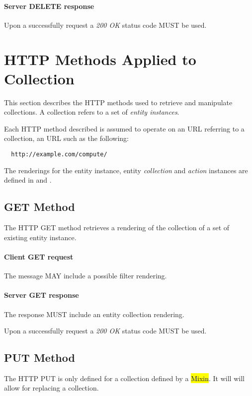 \documentclass[10pt,a4paper]{article}
\begin{document}
\paragraph{Server DELETE response}
Upon a successfully request a \emph{200 OK} status code MUST be used.

\section{HTTP Methods Applied to Collection}




This section describes the HTTP methods used to retrieve and manipulate
collections. A collection refers to a set of {\em entity instances}.

Each HTTP method described is assumed to operate
on an URL referring to a collection, an URL such as the following:
\begin{verbatim}
  http://example.com/compute/
\end{verbatim}

The renderings for the entity instance, entity {\em collection} and {\em action} instances are defined in \cite{occi:text} and \cite{occi:json}.

\subsection{GET Method}
The HTTP GET method retrieves a rendering of the collection of a set of existing entity instance.

\paragraph{Client GET request}
The message MAY include a possible filter rendering.

\paragraph{Server GET response}
The response MUST include an entity collection rendering.

Upon a successfully request a \emph{200 OK} status code MUST be used.

\subsection{PUT Method}
The HTTP PUT is only defined for a collection defined by a \hl{Mixin}. It will will allow for replacing a collection.
\end{document}
